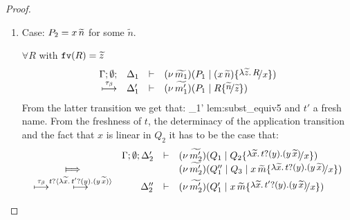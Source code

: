 \begin{proof}
\begin{enumerate}

	\item Case: $P_2 = x\, {\widetilde{n}}$ for some $\widetilde{n}$.


	\noi $\forall R$ with $\mathtt{fv}(R) = \widetilde{z}$
%
	\[
		\mhorel{\Gamma}{\Delta_1}{\newsp{\widetilde{m_1}}{P_1 \Par (\appl{x}{\widetilde{n}}) \subst{\abs{\widetilde{z}}{R}}{x}}}
		{\hby{\btau}}
		{\Delta_1'}{}{\newsp{\widetilde{m_1'}}{P_1 \Par  R \subst{\widetilde{n}}{\widetilde{z}}}}
	\]
%
	\noi From the latter transition we get that:
%
	{\hby{\btau} }
	{\Delta_1'}{}
	{lem:subst_equiv5}
%
%
	\noi and $t'$ a fresh name. From the freshness of $t$,
	the determinacy of the application transition
	and the fact that $x$ is linear in $Q_2$
	it has to be the case that:
%
	\[
		\begin{array}{crll}
			&\Gamma; \es; \Delta_2'& \proves &
			\newsp{\widetilde{m_2'}}{Q_1 \Par Q_2 \subst{\auxtr{t}}{x}}\\
			\Hby{} & & &
			\newsp{\widetilde{m_2'}}{Q_1'' \Par Q_3 \Par \appl{x}{\widetilde{m}} \subst{\auxtr{t}}{x}} \\
			\hby{\btau} \hby{\bactinp{t}{\auxtr{t'}}}
			& \Delta_2''& \proves& \newsp{\widetilde{m_2'}}{Q_1' \Par \appl{x}{\widetilde{m}} \subst{\auxtr{t'}}{x}}
		\end{array}
	\]
%
%

\end{enumerate}
\end{proof}
